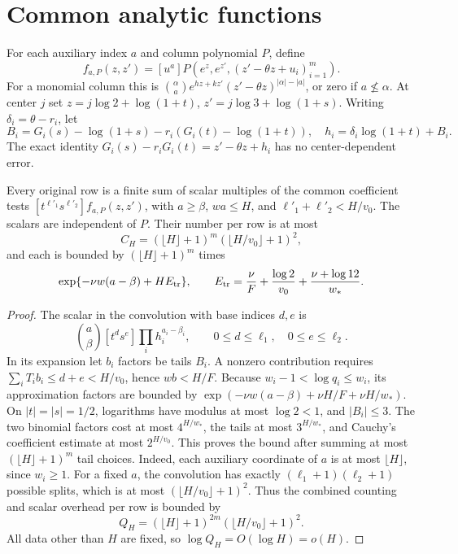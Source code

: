 \section{Common analytic functions}\label{sec:analysis}

For each auxiliary index \(a\) and column polynomial \(P\), define
\[
 f_{a,P}(z,z')=[u^a]P(e^z,e^{z'},(z'-\theta z+u_i)_{i=1}^m).
\]
For a monomial column this is
\(\binom\alpha a e^{hz+kz'}(z'-\theta z)^{|\alpha|-|a|}\), or
zero if \(a\not\leq\alpha\).
At center \(j\) set
\(z=j\log2+\log(1+t)\), \(z'=j\log3+\log(1+s)\).
Writing \(\delta_i=\theta-r_i\), let
\[
 B_i=G_i(s)-\log(1+s)-r_i(G_i(t)-\log(1+t)),\quad
 h_i=\delta_i\log(1+t)+B_i.
\]
The exact identity \(G_i(s)-r_iG_i(t)=z'-\theta z+h_i\)
has no center-dependent error.

\begin{lemma}\label{lem:translation}
Every original row is a finite sum of scalar multiples of the common
coefficient tests
\([t^{\ell'_1}s^{\ell'_2}]f_{a,P}(z,z')\), with
\(a\geq\beta\), \(wa\leq H\), and \(\ell'_1+\ell'_2<H/v_0\).
The scalars are independent of \(P\). Their number per row is at most
\[
 C_H=(\lfloor H\rfloor+1)^m
                  (\lfloor H/v_0\rfloor+1)^2,
\]
and each is bounded by \((\lfloor H\rfloor+1)^m\) times
\begin{equation}\label{eq:translation}
 \exp\{-\nu w(a-\beta)+HE_{\rm tr}\},\qquad
 E_{\rm tr}=\frac\nu F+\frac{\log2}{v_0}
                       +\frac{\nu+\log12}{w_*}.
\end{equation}
\end{lemma}
\begin{proof}
The scalar in the convolution with base indices \(d,e\) is
\[
 \binom a\beta[t^ds^e]\prod_i h_i^{a_i-\beta_i},
 \qquad 0\leq d\leq\ell_1,\quad0\leq e\leq\ell_2.
\]
In its expansion let \(b_i\) factors be tails \(B_i\). A nonzero
contribution requires \(\sum_iT_ib_i\leq d+e<H/v_0\), hence
\(wb<H/F\). Because \(w_i-1<\log q_i\leq w_i\), its approximation
factors are bounded by
\(\exp(-\nu w(a-\beta)+\nu H/F+\nu H/w_*)\).
On \(|t|=|s|=1/2\), logarithms have modulus at most \(\log2<1\),
and \(|B_i|\leq3\). The two binomial factors cost at most
\(4^{H/w_*}\), the tails at most \(3^{H/w_*}\), and Cauchy's
coefficient estimate at most \(2^{H/v_0}\). This proves the bound
after summing at most \((\lfloor H\rfloor+1)^m\) tail choices.
Indeed, each auxiliary coordinate of \(a\) is at most \(\lfloor H\rfloor\),
since \(w_i\geq1\). For a fixed \(a\), the convolution has exactly
\((\ell_1+1)(\ell_2+1)\) possible splits, which is at most
\((\lfloor H/v_0\rfloor+1)^2\). Thus the combined counting and
scalar overhead per row is bounded by
\[
 Q_H=(\lfloor H\rfloor+1)^{2m}
                  (\lfloor H/v_0\rfloor+1)^2.
\]
All data other than \(H\) are fixed, so \(\log Q_H=O(\log H)=o(H)\).
\end{proof}
